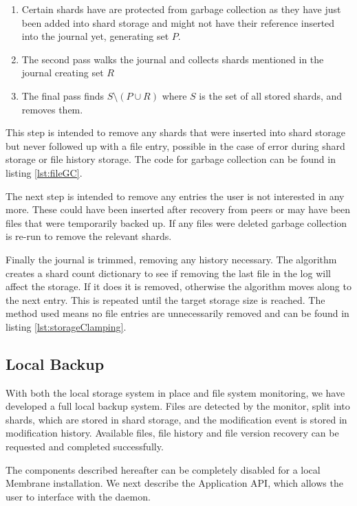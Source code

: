 \documentclass[11pt, a4paper, twocolumn, twoside]{report}
\begin{document}
\begin{enumerate}
 \item Certain shards have are protected from garbage collection as they have just been added into shard storage and might not have their reference inserted into the journal yet, generating set $P$.
 \item The second pass walks the journal and collects shards mentioned in the journal creating set $R$
 \item The final pass finds $S \setminus (P \cup R)$ where $S$ is the set of all stored shards, and removes them.
\end{enumerate}

This step is intended to remove any shards that were inserted into shard storage but never followed up with a file entry, possible in the case of error during shard storage or file history storage. The code for garbage collection can be found in listing \ref{lst:fileGC}.

The next step is intended to remove any entries the user is not interested in any more. These could have been inserted after recovery from peers or may have been files that were temporarily backed up. If any files were deleted garbage collection is re-run to remove the relevant shards.

Finally the journal is trimmed, removing any history necessary. The algorithm creates a shard count dictionary to see if removing the last file in the log will affect the storage. If it does it is removed, otherwise the algorithm moves along to the next entry. This is repeated until the target storage size is reached. The method used means no file entries are unnecessarily removed and can be found in listing \ref{lst:storageClamping}.

\subsection{Local Backup}

With both the local storage system in place and file system monitoring, we have developed a full local backup system. Files are detected by the monitor, split into shards, which are stored in shard storage, and the modification event is stored in modification history. Available files, file history and file version recovery can be requested and completed successfully.

The components described hereafter can be completely disabled for a local Membrane installation. We next describe the Application API, which allows the user to interface with the daemon.
\end{document}
